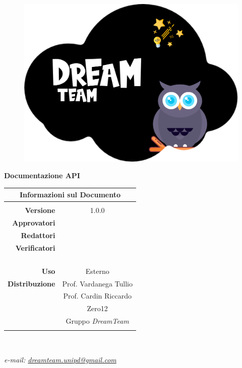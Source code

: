 
\begin{center}

\begin{figure}
\centering
\includegraphics[scale=0.05]{Contenuto/Immagini/DreamTeam.png} 
\end{figure}

{\Huge{\textbf{Documentazione API}}} \\ [1cm]
\begin{table}[htbp]
\centering
\begin{tabular}{r|c}
\multicolumn{2}{c}{\textbf{Informazioni sul Documento}} \\
\hline \\
\textbf{Versione} & 1.0.0 \\ \rule{0pt}{3ex}    
\textbf{Approvatori} & \PV{} \\ \rule{0pt}{3ex}      
\textbf{Redattori} & \MG{} \\ \rule{0pt}{2ex}     
\textbf{Verificatori} & \FP{} \\ \rule{0pt}{2ex}   
&  \\ \rule{0pt}{2ex}   
&  \\ \rule{0pt}{2ex}
&  \\ \rule{0pt}{2ex} 
&  \\ \rule{0pt}{3ex}        
\textbf{Uso} & Esterno \\ \rule{0pt}{3ex}    
\textbf{Distribuzione} & Prof. Vardanega Tullio \\ \rule{0pt}{2ex}   
& Prof. Cardin Riccardo \\ \rule{0pt}{2ex}
& Zero12 \\ \rule{0pt}{2ex}      
& Gruppo \textit{DreamTeam} \\ \rule{0pt}{0.1cm}   
\end{tabular} \\ [0.5cm]
\end{table}

\textsl{ e-mail: \href{mailto:dreamteam.unipd@gmail.com}{dreamteam.unipd@gmail.com} } \\[2cm]
\end{center}
\pagebreak